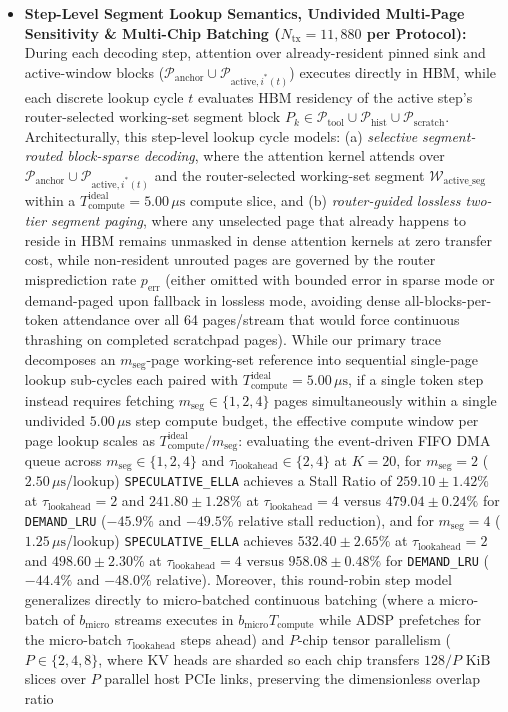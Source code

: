 \documentclass[conference,10pt]{IEEEtran}
\begin{document}
\begin{itemize}
    \item \textbf{Step-Level Segment Lookup Semantics, Undivided Multi-Page Sensitivity \& Multi-Chip Batching ($N_{\text{tx}} = 11{,}880$ per Protocol):} During each decoding step, attention over already-resident pinned sink and active-window blocks ($\mathcal{P}_{\text{anchor}} \cup \mathcal{P}_{\text{active}, i^*(t)}$) executes directly in HBM, while each discrete lookup cycle $t$ evaluates HBM residency of the active step's router-selected working-set segment block $P_k \in \mathcal{P}_{\text{tool}} \cup \mathcal{P}_{\text{hist}} \cup \mathcal{P}_{\text{scratch}}$. Architecturally, this step-level lookup cycle models: (a) \textit{selective segment-routed block-sparse decoding}, where the attention kernel attends over $\mathcal{P}_{\text{anchor}} \cup \mathcal{P}_{\text{active}, i^*(t)}$ and the router-selected working-set segment $\mathcal{W}_{\text{active\_seg}}$ within a $T_{\text{compute}}^{\text{ideal}} = 5.00\,\mu\text{s}$ compute slice, and (b) \textit{router-guided lossless two-tier segment paging}, where any unselected page that already happens to reside in HBM remains unmasked in dense attention kernels at zero transfer cost, while non-resident unrouted pages are governed by the router misprediction rate $p_{\text{err}}$ (either omitted with bounded error in sparse mode or demand-paged upon fallback in lossless mode, avoiding dense all-blocks-per-token attendance over all 64 pages/stream that would force continuous thrashing on completed scratchpad pages). While our primary trace decomposes an $m_{\text{seg}}$-page working-set reference into sequential single-page lookup sub-cycles each paired with $T_{\text{compute}}^{\text{ideal}} = 5.00\,\mu\text{s}$, if a single token step instead requires fetching $m_{\text{seg}} \in \{1, 2, 4\}$ pages simultaneously within a single undivided $5.00\,\mu\text{s}$ step compute budget, the effective compute window per page lookup scales as $T_{\text{compute}}^{\text{ideal}} / m_{\text{seg}}$: evaluating the event-driven FIFO DMA queue across $m_{\text{seg}} \in \{1, 2, 4\}$ and $\tau_{\text{lookahead}} \in \{2, 4\}$ at $K=20$, for $m_{\text{seg}} = 2$ ($2.50\,\mu\text{s}$/lookup) \texttt{SPECULATIVE\_ELLA} achieves a Stall Ratio of $\mathbf{259.10 \pm 1.42\%}$ at $\tau_{\text{lookahead}}=2$ and $\mathbf{241.80 \pm 1.28\%}$ at $\tau_{\text{lookahead}}=4$ versus $479.04 \pm 0.24\%$ for \texttt{DEMAND\_LRU} ($-45.9\%$ and $-49.5\%$ relative stall reduction), and for $m_{\text{seg}} = 4$ ($1.25\,\mu\text{s}$/lookup) \texttt{SPECULATIVE\_ELLA} achieves $\mathbf{532.40 \pm 2.65\%}$ at $\tau_{\text{lookahead}}=2$ and $\mathbf{498.60 \pm 2.30\%}$ at $\tau_{\text{lookahead}}=4$ versus $958.08 \pm 0.48\%$ for \texttt{DEMAND\_LRU} ($-44.4\%$ and $-48.0\%$ relative). Moreover, this round-robin step model generalizes directly to micro-batched continuous batching (where a micro-batch of $b_{\text{micro}}$ streams executes in $b_{\text{micro}} T_{\text{compute}}$ while ADSP prefetches for the micro-batch $\tau_{\text{lookahead}}$ steps ahead) and $P$-chip tensor parallelism ($P \in \{2, 4, 8\}$, where KV heads are sharded so each chip transfers $128/P\text{ KiB}$ slices over $P$ parallel host PCIe links, preserving the dimensionless overlap ratio 
\end{itemize}
\end{document}
